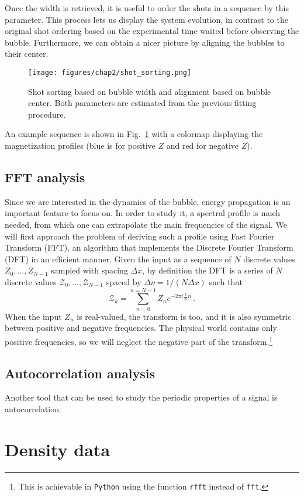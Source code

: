 Once the width is retrieved, it is useful to order the shots in a sequence by this parameter. This process lets us display the system evolution, in contrast to the original shot ordering based on the experimental time waited before observing the bubble. Furthermore, we can obtain a nicer picture by aligning the bubbles to their center.
\begin{figure}[t!]
    \centering
    \texttt{[image: figures/chap2/shot\_sorting.png]}
    \caption{Shot sorting based on bubble width and alignment based on bubble center. Both parameters are estimated from the previous fitting procedure.}
    \label{fig:sorting}
\end{figure}
An example sequence is shown in Fig.\ \ref{fig:sorting} with a colormap displaying the magnetization profiles (blue is for positive $Z$ and red for negative $Z$).

\subsection{FFT analysis}
Since we are interested in the dynamics of the bubble, energy propagation is an important feature to focus on. In order to study it, a spectral profile is much needed, from which one can extrapolate the main frequencies of the signal. We will first approach the problem of deriving such a profile using Fast Fourier Transform (FFT), an algorithm that implements the Discrete Fourier Transform (DFT) in an efficient manner. Given the input as a sequence of $N$ discrete values $Z_0,\dots,Z_{N-1}$ sampled with spacing $\Delta x$, by definition the DFT is a series of $N$ discrete values $\mathcal{Z}_0,\dots,\mathcal{Z}_{N-1}$ spaced by $\Delta\nu = 1/(N\Delta x)$ such that
\begin{equation*}
    \mathcal{Z}_k = \sum_{n=0}^{n=N-1} Z_n e^{-2\pi i \frac{k}{N}n}\, .
\end{equation*}
When the input $Z_n$ is real-valued, the transform is too, and it is also symmetric between positive and negative frequencies. The physical world contains only positive frequencies, so we will neglect the negative part of the transform.\footnote{This is achievable in \texttt{Python} using the function \texttt{rfft} instead of \texttt{fft}.}

\newpage
\subsection{Autocorrelation analysis}
Another tool that can be used to study the periodic properties of a signal is autocorrelation.

\section{Density data}
